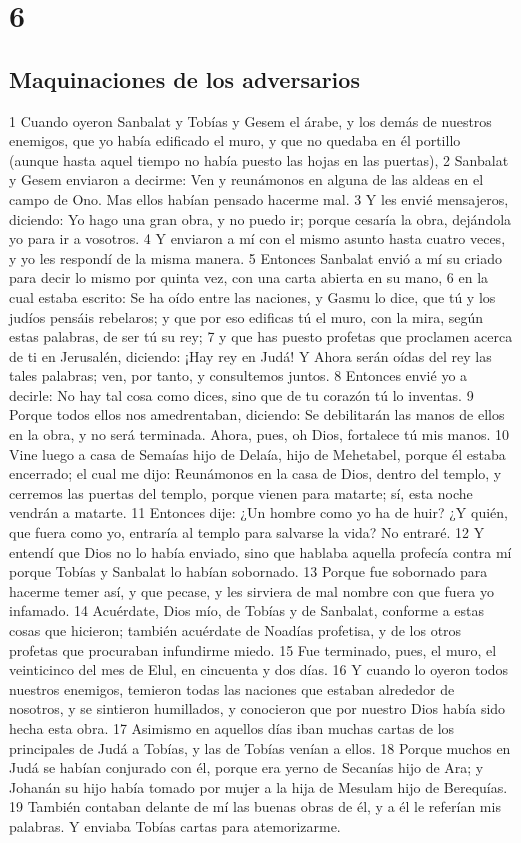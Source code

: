 \chapter{6}

\section*{Maquinaciones de los adversarios}

1 Cuando oyeron Sanbalat y Tobías y Gesem el árabe, y los demás de nuestros enemigos, que yo había edificado el muro, y que no quedaba en él portillo (aunque hasta aquel tiempo no había puesto las hojas en las puertas),
2 Sanbalat y Gesem enviaron a decirme: Ven y reunámonos en alguna de las aldeas en el campo de Ono. Mas ellos habían pensado hacerme mal.
3 Y les envié mensajeros, diciendo: Yo hago una gran obra, y no puedo ir; porque cesaría la obra, dejándola yo para ir a vosotros.
4 Y enviaron a mí con el mismo asunto hasta cuatro veces, y yo les respondí de la misma manera.
5 Entonces Sanbalat envió a mí su criado para decir lo mismo por quinta vez, con una carta abierta en su mano,
6 en la cual estaba escrito: Se ha oído entre las naciones, y Gasmu lo dice, que tú y los judíos pensáis rebelaros; y que por eso edificas tú el muro, con la mira, según estas palabras, de ser tú su rey; 
7 y que has puesto profetas que proclamen acerca de ti en Jerusalén, diciendo: ¡Hay rey en Judá! Y Ahora serán oídas del rey las tales palabras; ven, por tanto, y consultemos juntos.
8 Entonces envié yo a decirle: No hay tal cosa como dices, sino que de tu corazón tú lo inventas.
9 Porque todos ellos nos amedrentaban, diciendo: Se debilitarán las manos de ellos en la obra, y no será terminada. Ahora, pues, oh Dios, fortalece tú mis manos.
10 Vine luego a casa de Semaías hijo de Delaía, hijo de Mehetabel, porque él estaba encerrado; el cual me dijo: Reunámonos en la casa de Dios, dentro del templo, y cerremos las puertas del templo, porque vienen para matarte; sí, esta noche vendrán a matarte. 
11 Entonces dije: ¿Un hombre como yo ha de huir? ¿Y quién, que fuera como yo, entraría al templo para salvarse la vida? No entraré.
12 Y entendí que Dios no lo había enviado, sino que hablaba aquella profecía contra mí porque Tobías y Sanbalat lo habían sobornado.
13 Porque fue sobornado para hacerme temer así, y que pecase, y les sirviera de mal nombre con que fuera yo infamado.
14 Acuérdate, Dios mío, de Tobías y de Sanbalat, conforme a estas cosas que hicieron; también acuérdate de Noadías profetisa, y de los otros profetas que procuraban infundirme miedo.
15 Fue terminado, pues, el muro, el veinticinco del mes de Elul, en cincuenta y dos días.
16 Y cuando lo oyeron todos nuestros enemigos, temieron todas las naciones que estaban alrededor de nosotros, y se sintieron humillados, y conocieron que por nuestro Dios había sido hecha esta obra.
17 Asimismo en aquellos días iban muchas cartas de los principales de Judá a Tobías, y las de Tobías venían a ellos.
18 Porque muchos en Judá se habían conjurado con él, porque era yerno de Secanías hijo de Ara; y Johanán su hijo había tomado por mujer a la hija de Mesulam hijo de Berequías.
19 También contaban delante de mí las buenas obras de él, y a él le referían mis palabras. Y enviaba Tobías cartas para atemorizarme.

